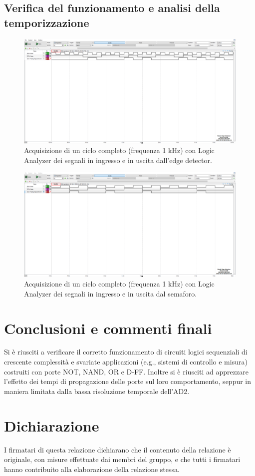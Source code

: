 \documentclass[10pt, a4paper, italian]{article}
\begin{document}
\subsection{Verifica del funzionamento e analisi della temporizzazione}
\begin{figure}[htbp]
    \centering
    \includegraphics[width=\textwidth]{Moore_edge_detector}
    \caption{Acquisizione di un ciclo completo (frequenza 1 kHz) con Logic
    Analyzer dei segnali in ingresso e in uscita dall'edge detector.
    \label{fig: edgeMoore}}
\end{figure}

\begin{figure}[htbp]
    \centering
    \includegraphics[width=\textwidth]{Mealy_edge_detector}
    \caption{Acquisizione di un ciclo completo (frequenza 1 kHz) con Logic
    Analyzer dei segnali in ingresso e in uscita dal semaforo.
    \label{fig: edgeMealy}}
\end{figure}

\section*{Conclusioni e commenti finali}
Si è riusciti a verificare il corretto funzionamento di circuiti logici
sequenziali di crescente complessità e svariate applicazioni (e.g., sistemi di
controllo e misura) costruiti con porte NOT, NAND, OR e D-FF.
Inoltre si è riusciti ad apprezzare l'effetto dei tempi di propagazione
delle porte sul loro comportamento, seppur in maniera limitata dalla bassa
risoluzione temporale dell'AD2.

\section*{Dichiarazione}
I firmatari di questa relazione dichiarano che il contenuto della relazione \`e
originale, con misure effettuate dai membri del gruppo, e che tutti i firmatari
hanno contribuito alla elaborazione della relazione stessa.
\end{document}
